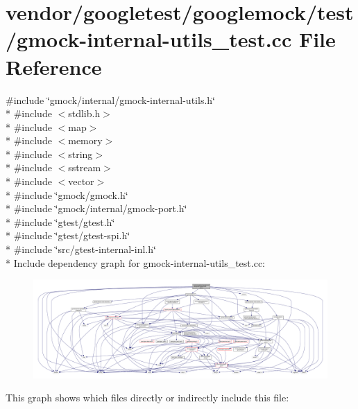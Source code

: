 \hypertarget{gmock-internal-utils__test_8cc}{}\section{vendor/googletest/googlemock/test/gmock-\/internal-\/utils\+\_\+test.cc File Reference}
\label{gmock-internal-utils__test_8cc}
{\ttfamily \#include \char`\"{}gmock/internal/gmock-\/internal-\/utils.\+h\char`\"{}}\\*
{\ttfamily \#include $<$stdlib.\+h$>$}\\*
{\ttfamily \#include $<$map$>$}\\*
{\ttfamily \#include $<$memory$>$}\\*
{\ttfamily \#include $<$string$>$}\\*
{\ttfamily \#include $<$sstream$>$}\\*
{\ttfamily \#include $<$vector$>$}\\*
{\ttfamily \#include \char`\"{}gmock/gmock.\+h\char`\"{}}\\*
{\ttfamily \#include \char`\"{}gmock/internal/gmock-\/port.\+h\char`\"{}}\\*
{\ttfamily \#include \char`\"{}gtest/gtest.\+h\char`\"{}}\\*
{\ttfamily \#include \char`\"{}gtest/gtest-\/spi.\+h\char`\"{}}\\*
{\ttfamily \#include \char`\"{}src/gtest-\/internal-\/inl.\+h\char`\"{}}\\*
Include dependency graph for gmock-\/internal-\/utils\+\_\+test.cc\+:\nopagebreak
\begin{figure}[H]
\begin{center}
\leavevmode
\includegraphics[width=350pt]{gmock-internal-utils__test_8cc__incl}
\end{center}
\end{figure}
This graph shows which files directly or indirectly include this file\+:\nopagebreak

